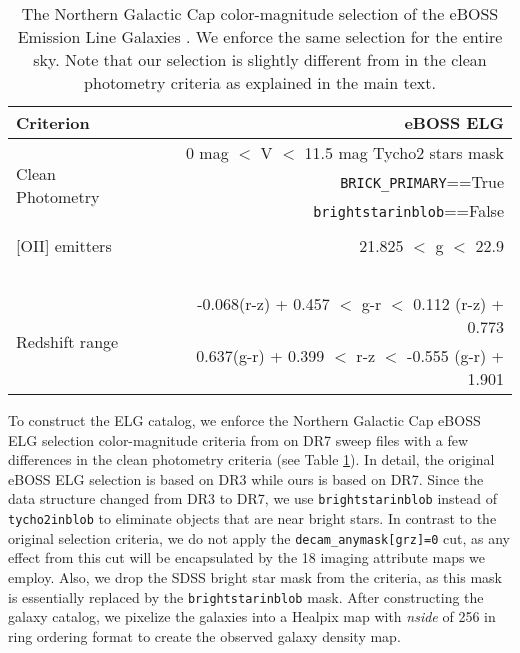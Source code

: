 \documentclass[fleqn, usenatbib]{mnras}
\begin{document}
 
\begin{table}
  \begin{center}
    \caption{The Northern Galactic Cap color-magnitude selection of the eBOSS Emission Line Galaxies \citep{Raichoor2017MNRAS.471.3955R}. We enforce the same selection for the entire sky. Note that our selection is slightly different from \citet{Raichoor2017MNRAS.471.3955R} in the clean photometry criteria as explained in the main text.}
    \label{tab:ts}
    \begin{tabular}{l|r}
    \hline
	\hline
      \textbf{Criterion} & \textbf{eBOSS ELG}\\
      \hline
      \multirow{4}{*}{\scriptsize{Clean Photometry}} & \scriptsize{0 mag $<$ V $<$ 11.5 mag Tycho2 stars mask}\\
& \scriptsize{\texttt{BRICK\_PRIMARY}==True}\\
& \scriptsize{\texttt{brightstarinblob}==False} \\~\\
      \scriptsize{[OII] emitters} &  \scriptsize{21.825 $<$ g $<$ 22.9} \\~\\
      \multirow{2}{*}{\scriptsize{Redshift range}} & \scriptsize{-0.068(r-z) + 0.457 $<$ g-r $<$ 0.112 (r-z) + 0.773}\\
 & \scriptsize{0.637(g-r) + 0.399 $<$ r-z $<$ -0.555 (g-r) + 1.901}\\
      \hline
      \hline
      \end{tabular}
  \end{center}
\end{table}


To construct the ELG catalog, we enforce the Northern Galactic Cap eBOSS ELG selection color-magnitude criteria from \citet{Raichoor2017MNRAS.471.3955R} on DR7 sweep files \citep{dey2018overview} with a few differences in the clean photometry criteria (see Table \ref{tab:ts}). In detail, the original eBOSS ELG selection is based on DR3 while ours is based on DR7. Since the data structure changed from DR3 to DR7, we use \texttt{brightstarinblob} instead of \texttt{tycho2inblob} to eliminate objects that are near bright stars. In contrast to the original selection criteria, we do not apply the \texttt{decam\_anymask[grz]=0} cut, as any effect from this cut will be encapsulated by the 18 imaging attribute maps we employ. Also, we drop the SDSS bright star mask from the criteria, as this mask is essentially replaced by the \texttt{brightstarinblob} mask. After constructing the galaxy catalog, we pixelize the galaxies into a Healpix map with \textit{nside} of 256 in ring ordering format to create the observed galaxy density map.\\
\end{document}
